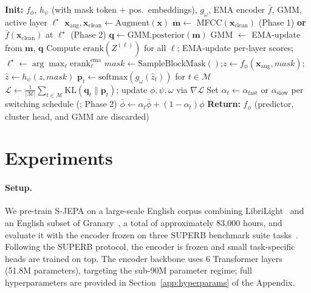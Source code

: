 \documentclass[9pt,twocolumn]{article}
\theoremstyle{plain}
\theoremstyle{definition}
\theoremstyle{remark}
\begin{document}
\begin{algorithm}[t]
\small
\caption{S-JEPA Training (Phase 1 fixes GMM and uses MFCC inputs).}
\label{alg:training}
\begin{algorithmic}[1]
\STATE \textbf{Init:} $f_\phi$, $h_\psi$ (with mask token + pos.\ embeddings), $g_\omega$, EMA encoder $\bar{f}$, GMM, active layer $\ell^\star$
    \STATE $\mathbf{x}_{\text{aug}}, \mathbf{x}_{\text{clean}} \gets \text{Augment}(\mathbf{x})$
    \STATE $\mathbf{m} \gets$ MFCC$(\mathbf{x}_{\text{clean}})$ (Phase 1) \textbf{or} $\bar{f}(\mathbf{x}_{\text{clean}})$ at $\ell^\star$ (Phase 2) 
    \STATE $\mathbf{q} \gets \text{GMM.posterior}(\mathbf{m})$
        \STATE GMM $\gets$ EMA-update from $\mathbf{m}$, $\mathbf{q}$
    \ENDIF
        \STATE Compute $\mathrm{erank}(Z^{(\ell)})$ for all $\ell$; EMA-update per-layer scores; $\ell^\star \gets \arg\max_\ell \mathrm{erank}^{\text{ema}}_\ell$
    \ENDIF
    \STATE $\mathit{mask} \gets \text{SampleBlockMask}()$;\quad $z \gets f_\phi(\mathbf{x}_{\text{aug}}, \mathit{mask})$;\quad $\hat{z} \gets h_\psi(z, \mathit{mask})$
    \STATE $\mathbf{p}_t \gets \text{softmax}(g_\omega(\hat{z}_t))$ for $t \in \mathcal{M}$
    \STATE $\mathcal{L} \gets \tfrac{1}{|\mathcal{M}|} \sum_{t \in \mathcal{M}} \text{KL}(\mathbf{q}_t \| \mathbf{p}_t)$; update $\phi, \psi, \omega$ via $\nabla \mathcal{L}$
    \STATE Set $\alpha_t \gets \alpha_{\text{fast}}$ or $\alpha_{\text{slow}}$ per switching schedule (; Phase 2)
    \STATE $\bar{\phi} \gets \alpha_t \bar{\phi} + (1-\alpha_t) \phi$
\ENDFOR
\STATE \textbf{Return:} $f_\phi$ (predictor, cluster head, and GMM are discarded)
\end{algorithmic}
\end{algorithm}
\fi
\section{Experiments}

\label{sec:experiments}

\paragraph{Setup.} We pre-train S-JEPA on a large-scale English corpus combining LibriLight~\citep{kahn2020librilight} and an English subset of Granary~\citep{bai2024granary}, a total of approximately 83,000 hours, and evaluate it with the encoder frozen on three SUPERB benchmark suite tasks~\citep{yang2021superbspeechprocessinguniversal}. Following the SUPERB protocol, the encoder is frozen and small task-specific heads are trained on top. The encoder backbone uses 6 Transformer layers (51.8M parameters), targeting the sub-90M parameter regime; full hyperparameters are provided in Section~\ref{app:hyperparams} of the Appendix.
\end{document}
